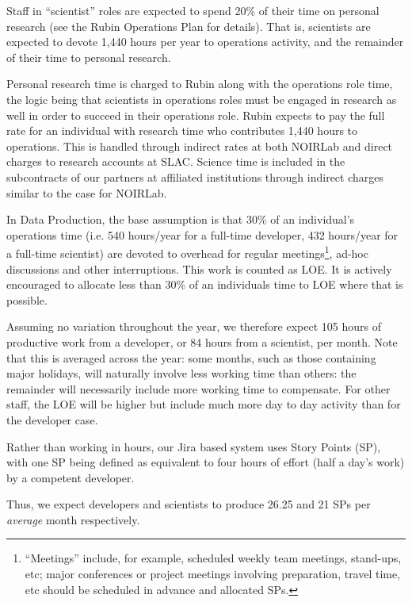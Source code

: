 Staff in ``scientist'' roles are expected to spend 20\% of their time on personal research (see the Rubin Operations Plan for details).
That is, scientists are expected to devote 1,440 hours per
year to operations activity, and the remainder of their time to personal research.

Personal research time is charged to Rubin along with the operations role time, the logic being that 
scientists in operations roles must be engaged in research as well in order to succeed in their operations role.
Rubin expects to pay the full rate for an individual with research time who contributes 1,440 hours to
operations. 
This is handled through indirect rates at both NOIRLab and direct charges to research accounts at SLAC. 
Science time is included in the subcontracts of our partners at affiliated institutions through indirect charges 
similar to the case for NOIRLab.

In Data Production, the base assumption is that 30\% of an individual's \RO operations time (i.e. 540 hours/year for a full-time developer, 432 hours/year for a full-time scientist) are devoted to overhead for regular meetings\footnote{``Meetings'' include, for example, scheduled weekly team meetings, stand-ups, etc; major conferences or project meetings involving preparation, travel time, etc should be scheduled in advance and allocated \glspl{SP}.}, ad-hoc discussions and other interruptions.
This work is counted as \gls{LOE}.
It is actively encouraged to allocate less than 30\% of an individuals time to \gls{LOE} where that is possible.

Assuming no variation throughout the year, we therefore expect 105 hours of productive work from a developer, or 84 hours from a scientist, per month.
Note that this is averaged across the year: some months, such as those containing major holidays, will naturally involve less working time than others: the remainder will necessarily include more working time to compensate. For other staff, the \gls{LOE} will be higher but include much more day to day activity than for the developer case.

Rather than working in hours, our Jira based system uses Story Points (\gls{SP}), with one \gls{SP} being defined as equivalent to four hours of effort (half a day's work) by a competent developer.

Thus, we expect developers and scientists to produce 26.25 and 21 \glspl{SP} per \emph{average} month respectively.

